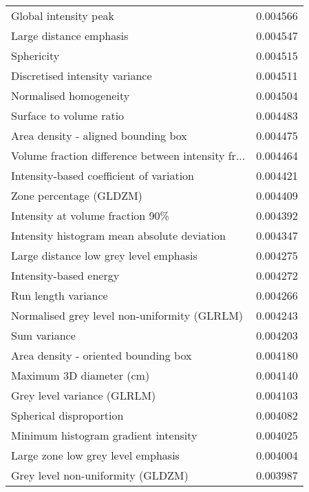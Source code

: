 \begin{longtable}{|lr|}
Global intensity peak                              &        0.004566 \\
Large distance emphasis                            &        0.004547 \\
Sphericity                                         &        0.004515 \\
Discretised intensity variance                     &        0.004511 \\
Normalised homogeneity                             &        0.004504 \\
Surface to volume ratio                            &        0.004483 \\
Area density - aligned bounding box                &        0.004475 \\
Volume fraction difference between intensity fr... &        0.004464 \\
Intensity-based coefficient of variation           &        0.004421 \\
Zone percentage (GLDZM)                            &        0.004409 \\
Intensity at volume fraction 90\%                   &        0.004392 \\
Intensity histogram mean absolute deviation        &        0.004347 \\
Large distance low grey level emphasis             &        0.004275 \\
Intensity-based energy                             &        0.004272 \\
Run length variance                                &        0.004266 \\
Normalised grey level non-uniformity (GLRLM)       &        0.004243 \\
Sum variance                                       &        0.004203 \\
Area density - oriented bounding box               &        0.004180 \\
Maximum 3D diameter (cm)                           &        0.004140 \\
Grey level variance (GLRLM)                        &        0.004103 \\
Spherical disproportion                            &        0.004082 \\
Minimum histogram gradient intensity               &        0.004025 \\
Large zone low grey level emphasis                 &        0.004004 \\
Grey level non-uniformity (GLDZM)                  &        0.003987 \\

\end{longtable}
